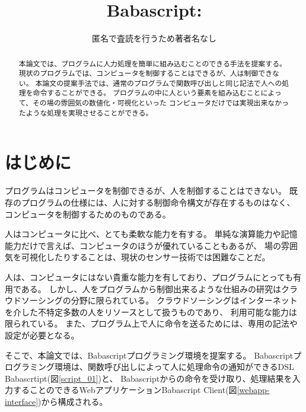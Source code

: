 \title{Babascript: }


\author{匿名で査読を行うため著者名なし
  }

\begin{abstract}

本論文では、プログラムに人力処理を簡単に組み込むことのできる手法を提案する。
現状のプログラムでは、コンピュータを制御することはできるが、人は制御できない。
本論文の提案手法では、通常のプログラムで関数呼び出しと同じ記法で人への処理を命令することができる。
プログラムの中に人という要素を組み込むことによって、その場の雰囲気の数値化・可視化といった
コンピュータだけでは実現出来なかったような処理を実現させることができる。

\end{abstract}

\maketitle

\section{はじめに}\label{ux306fux3058ux3081ux306b}

プログラムはコンピュータを制御できるが、人を制御することはできない。
既存のプログラムの仕様には、人に対する制御命令構文が存在するものはなく、
コンピュータを制御するためのものである。

人はコンピュータに比べ、とても柔軟な能力を有する。
単純な演算能力や記憶能力だけで言えば、コンピュータのほうが優れていることもあるが、
場の雰囲気を可視化したりすることは、現状のセンサー技術では困難なことだ。

人は、コンピュータにはない貴重な能力を有しており、プログラムにとっても有用である。
しかし、人をプログラムから制御出来るような仕組みの研究はクラウドソーシングの分野に限られている。
クラウドソーシングはインターネットを介した不特定多数の人をリソースとして扱うものであり、
利用可能な能力は限られている。
また、プログラム上で人に命令を送るためには、専用の記法や設定が必要となる。

そこで、本論文では、Babascriptプログラミング環境を提案する。
Babascriptプログラミング環境は、関数呼び出しによって人に処理命令の通知ができるDSL
Babascrtipt(図\ref{script_01})と、
Babascriptからの命令を受け取り、処理結果を入力することのできるWebアプリケーションBabascript
Client(図\ref{webapp-interface})から構成される。

